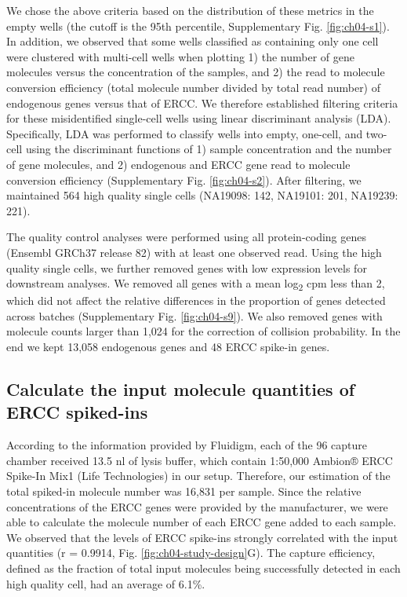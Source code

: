 We chose the above criteria based on the distribution of these metrics
in the empty wells (the cutoff is the 95th percentile, Supplementary
Fig. \ref{fig:ch04-s1}). In addition, we observed that some wells
classified as containing only one cell were clustered with multi-cell
wells when plotting 1) the number of gene molecules versus the
concentration of the samples, and 2) the read to molecule conversion
efficiency (total molecule number divided by total read number) of
endogenous genes versus that of ERCC. We therefore established
filtering criteria for these misidentified single-cell wells using
linear discriminant analysis (LDA). Specifically, LDA was performed to
classify wells into empty, one-cell, and two-cell using the
discriminant functions of 1) sample concentration and the number of
gene molecules, and 2) endogenous and ERCC gene read to molecule
conversion efficiency (Supplementary Fig.  \ref{fig:ch04-s2}). After
filtering, we maintained 564 high quality single cells (NA19098: 142,
NA19101: 201, NA19239: 221).

The quality control analyses were performed using all protein-coding
genes (Ensembl GRCh37 release 82) with at least one observed
read. Using the high quality single cells, we further removed genes
with low expression levels for downstream analyses. We removed all
genes with a mean log\textsubscript{2} cpm less than 2, which did not
affect the relative differences in the proportion of genes detected
across batches (Supplementary Fig. \ref{fig:ch04-s9}). We also removed
genes with molecule counts larger than 1,024 for the correction of
collision probability. In the end we kept 13,058 endogenous genes and
48 ERCC spike-in genes.

\subsection{Calculate the input molecule quantities of ERCC
spiked-ins}\label{calculate-the-input-molecule-quantities-of-ercc-spiked-ins}

According to the information provided by Fluidigm, each of the 96
capture chamber received 13.5 nl of lysis buffer, which contain
1:50,000 Ambion® ERCC Spike-In Mix1 (Life Technologies) in our
setup. Therefore, our estimation of the total spiked-in molecule
number was 16,831 per sample. Since the relative concentrations of the
ERCC genes were provided by the manufacturer, we were able to
calculate the molecule number of each ERCC gene added to each
sample. We observed that the levels of ERCC spike-ins strongly
correlated with the input quantities (r = 0.9914,
Fig. \ref{fig:ch04-study-design}G). The capture efficiency, defined as
the fraction of total input molecules being successfully detected in
each high quality cell, had an average of 6.1\%.

